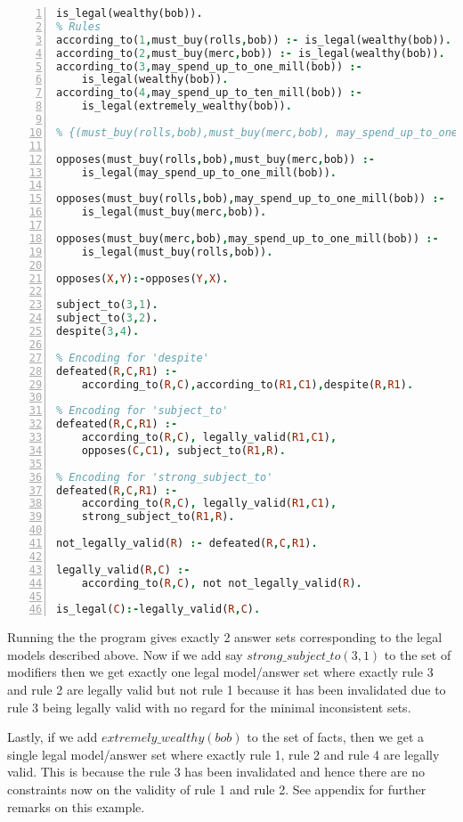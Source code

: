 \begin{lstlisting}[language=Prolog, numbers=left]
is_legal(wealthy(bob)).
% Rules
according_to(1,must_buy(rolls,bob)) :- is_legal(wealthy(bob)).
according_to(2,must_buy(merc,bob)) :- is_legal(wealthy(bob)).
according_to(3,may_spend_up_to_one_mill(bob)) :-
    is_legal(wealthy(bob)).
according_to(4,may_spend_up_to_ten_mill(bob)) :-
    is_legal(extremely_wealthy(bob)).

% {(must_buy(rolls,bob),must_buy(merc,bob), may_spend_up_to_one_mill(bob)} is a min. inconsistent set.

opposes(must_buy(rolls,bob),must_buy(merc,bob)) :-
    is_legal(may_spend_up_to_one_mill(bob)).

opposes(must_buy(rolls,bob),may_spend_up_to_one_mill(bob)) :-
    is_legal(must_buy(merc,bob)).

opposes(must_buy(merc,bob),may_spend_up_to_one_mill(bob)) :-
    is_legal(must_buy(rolls,bob)).

opposes(X,Y):-opposes(Y,X).

subject_to(3,1).
subject_to(3,2).
despite(3,4).

% Encoding for 'despite'
defeated(R,C,R1) :-
    according_to(R,C),according_to(R1,C1),despite(R,R1).

% Encoding for 'subject_to'
defeated(R,C,R1) :-
    according_to(R,C), legally_valid(R1,C1),
    opposes(C,C1), subject_to(R1,R).

% Encoding for 'strong_subject_to'
defeated(R,C,R1) :-
    according_to(R,C), legally_valid(R1,C1),
    strong_subject_to(R1,R).

not_legally_valid(R) :- defeated(R,C,R1).

legally_valid(R,C) :- 
    according_to(R,C), not not_legally_valid(R).

is_legal(C):-legally_valid(R,C).
\end{lstlisting}
Running the the program gives exactly 2 answer sets corresponding to the legal models described above. Now if we add say $strong\_subject\_to(3,1)$ to the set of modifiers then we get exactly one legal model/answer set where exactly rule 3 and rule 2 are legally valid but not rule 1 because it has been invalidated due to rule 3 being legally valid with no regard for the minimal inconsistent sets.

Lastly, if we add $extremely\_wealthy(bob)$ to the set of facts, then we get a single legal model/answer set where exactly rule 1, rule 2 and rule 4 are legally valid. This is because the rule 3 has been invalidated and hence there are no constraints now on the validity of rule 1 and rule 2. See appendix for further remarks on this example.



